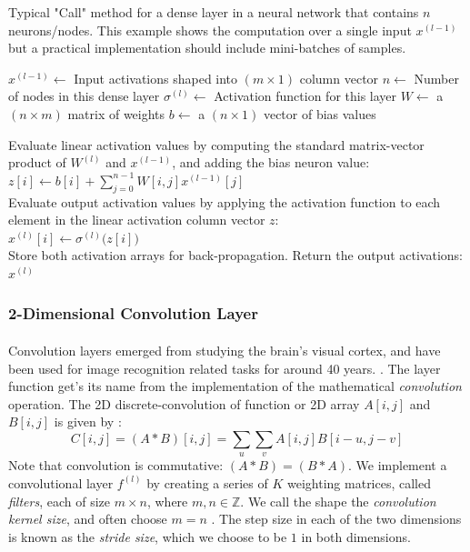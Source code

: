 \documentclass[12pt,letterpaper]{article}
\begin{document}
\begin{algorithm}[H]
\caption{Typical "Call" method for a dense layer in a neural network that contains $n$ neurons/nodes. This example shows the computation over a single input $x^{(l-1)}$ but a practical implementation should include mini-batches of samples.}
\label{alg-CallDense}

\begin{algorithmic}
\REQUIRE $x^{(l-1)} \leftarrow$ Input activations shaped into $(m \times 1)$ column vector
\REQUIRE $n \leftarrow$ Number of nodes in this dense layer
\REQUIRE $\sigma^{(l)} \leftarrow$ Activation function for this layer
\REQUIRE $W \leftarrow$ a $(n \times m)$ matrix of weights
\REQUIRE $b \leftarrow$ a $(n \times 1)$ vector of bias values

Evaluate linear activation values by computing the standard matrix-vector product of $W^{(l)}$ and $x^{(l-1)}$, and adding the bias neuron value:\\
$z[i] \leftarrow b[i] + \sum_{j=0}^{n-1} W[i,j] x^{(l-1)}[j]$ \\
Evaluate output activation values by applying the activation function to each element in the linear activation column vector $z$:\\
$x^{(l)}[i] \leftarrow \sigma^{(l)}\big( z[i] \big)$ \\

Store both activation arrays for back-propagation. Return the output activations:\\
\RETURN $x^{(l)}$

\end{algorithmic}
\end{algorithm}


\subsubsection{2-Dimensional Convolution Layer}
\label{subsubsec-Conv2DLayer}

\paragraph*{}Convolution layers emerged from studying the brain's visual cortex, and have been used for image recognition related tasks for around 40 years. \cite{Geron,Loy}. The layer function get's its name from the implementation of the mathematical \textit{convolution} operation. The 2D discrete-convolution of function or 2D array $A[i,j]$ and $B[i,j]$ is given by \cite{Goodfellow}:
\begin{equation}
\label{eqn-convolution}
C[i,j] = (A * B)[i,j] = \sum_{u}\sum_{v} A[i,j]B[i - u,j - v]
\end{equation}
Note that convolution is commutative: $(A * B) = (B * A)$. We implement a convolutional layer $f^{(l)}$ by creating a series of $K$ weighting matrices, called \textit{filters}, each of size $m \times n$, where $m,n \in \mathbb{Z}$. We call the shape the \textit{convolution kernel size}, and often choose $m = n$ \cite{Loy, Goodfellow}. The step size in each of the two dimensions is known as the \textit{stride size}, which we choose to be $1$ in both dimensions.
\end{document}
